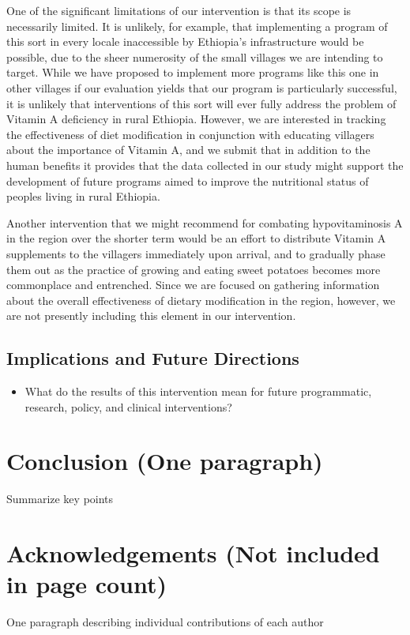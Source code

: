 \documentclass[12pt, letterpaper, draft]{article}
\begin{document}
One of the significant limitations of our intervention is that its scope is necessarily limited. It is unlikely, for example, that implementing a program of this sort in every locale inaccessible by Ethiopia's infrastructure would be possible, due to the sheer numerosity of the small villages we are intending to target. While we have proposed to implement more programs like this one in other villages if our evaluation yields that our program is particularly successful, it is unlikely that interventions of this sort will ever fully address the problem of Vitamin A deficiency in rural Ethiopia. However, we are interested in tracking the effectiveness of diet modification in conjunction with educating villagers about the importance of Vitamin A, and we submit that in addition to the human benefits it provides that the data collected in our study might support the development of future programs aimed to improve the nutritional status of peoples living in rural Ethiopia.

Another intervention that we might recommend for combating hypovitaminosis A in the region over the shorter term would be an effort to distribute Vitamin A supplements to the villagers immediately upon arrival, and to gradually phase them out as the practice of growing and eating sweet potatoes becomes more commonplace and entrenched. Since we are focused on gathering information about the overall effectiveness of dietary modification in the region, however, we are not presently including this element in our intervention.

\subsection{Implications and Future Directions}
\begin{itemize}
    \item What do the results of this intervention mean for future programmatic,
    research, policy, and clinical interventions?
\end{itemize}

\section{Conclusion (One paragraph)}
Summarize key points
\pagebreak

\section{Acknowledgements (Not included in page count)}
One paragraph describing individual contributions of each author
\pagebreak
\pagestyle{empty}



\end{document}
